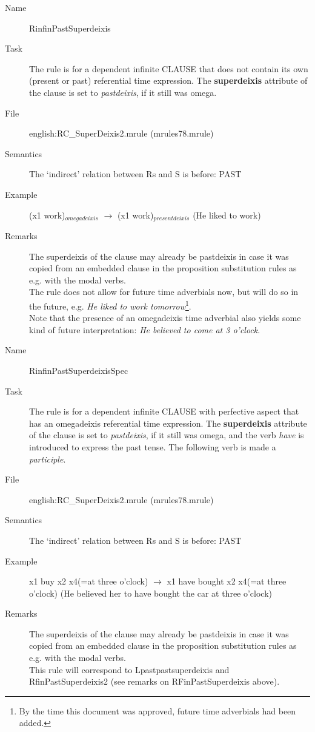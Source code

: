 \begin{description}
\vspace{1 cm}
\begin{description}
\item[Name] RinfinPastSuperdeixis
\item[Task] The rule is for a dependent infinite CLAUSE that does not contain its 
own (present or past) referential time expression. 
The {\bf superdeixis} attribute of the clause is set to {\em pastdeixis\/}, 
if it still was omega. 
\item[File] english:RC\_SuperDeixis2.mrule (mrules78.mrule)
\item[Semantics] The `indirect' relation between Rs and S is before: PAST
\item[Example] 
(x1 work)$_{omegadeixis}$ $\rightarrow$ (x1 work)$_{presentdeixis}$ (He liked
to work)
\item[Remarks] 
The superdeixis of the clause may already be  pastdeixis in 
case it was copied from an embedded  clause in the proposition substitution 
rules as e.g. with the modal verbs. \\
The rule does not allow for future time adverbials now, but will do so in the 
future, e.g. {\em He liked to work tomorrow\/}\footnote{By the time this 
document was approved, future time adverbials had been added.}.\\
Note that the presence of an 
omegadeixis time adverbial also yields some kind of future interpretation:
{\em He believed to come at 3 o'clock}.
\end{description}

\vspace{1 cm}
\begin{description}
\item[Name]   RinfinPastSuperdeixisSpec
\item[Task] The rule is for a dependent infinite CLAUSE with perfective aspect
that has 
an omegadeixis referential time expression. 
The {\bf superdeixis} attribute of the clause is set to {\em pastdeixis\/}, 
if it still was omega, and the verb {\em have\/} is introduced to express the 
past tense. The following verb is made a {\em participle\/}.
\item[File] english:RC\_SuperDeixis2.mrule (mrules78.mrule)
\item[Semantics] The `indirect' relation between Rs and S is before: PAST
\item[Example] 
x1 buy x2 x4(=at three o'clock) $\rightarrow$ x1 have bought x2 x4(=at three 
o'clock)  (He believed her to have bought the car at three o'clock)
\item[Remarks] 
The superdeixis of the clause may already be  pastdeixis in 
case it was copied from an embedded  clause in the proposition substitution 
rules as e.g. with the modal verbs. \\
This rule will correspond to Lpastpastsuperdeixis and RfinPastSuperdeixis2 
(see remarks on RFinPastSuperdeixis above).
\end{description}



\end{description}
